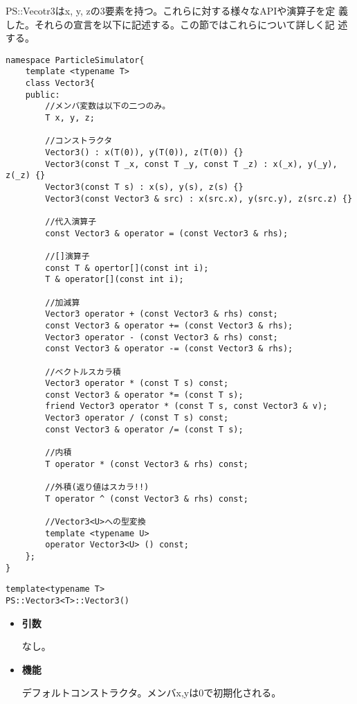 PS::Vecotr3はx, y, zの3要素を持つ。これらに対する様々なAPIや演算子を定
義した。それらの宣言を以下に記述する。この節ではこれらについて詳しく記
述する。
\begin{lstlisting}[caption=Vector3]
namespace ParticleSimulator{
    template <typename T>
    class Vector3{
    public:
        //メンバ変数は以下の二つのみ。
        T x, y, z;

        //コンストラクタ
        Vector3() : x(T(0)), y(T(0)), z(T(0)) {}
        Vector3(const T _x, const T _y, const T _z) : x(_x), y(_y), z(_z) {}
        Vector3(const T s) : x(s), y(s), z(s) {}
        Vector3(const Vector3 & src) : x(src.x), y(src.y), z(src.z) {}

        //代入演算子
        const Vector3 & operator = (const Vector3 & rhs);

        //[]演算子
        const T & opertor[](const int i);
        T & operator[](const int i);

        //加減算
        Vector3 operator + (const Vector3 & rhs) const;
        const Vector3 & operator += (const Vector3 & rhs);
        Vector3 operator - (const Vector3 & rhs) const;
        const Vector3 & operator -= (const Vector3 & rhs);

        //ベクトルスカラ積
        Vector3 operator * (const T s) const;
        const Vector3 & operator *= (const T s);
        friend Vector3 operator * (const T s, const Vector3 & v);
        Vector3 operator / (const T s) const;
        const Vector3 & operator /= (const T s);

        //内積
        T operator * (const Vector3 & rhs) const;

        //外積(返り値はスカラ!!)
        T operator ^ (const Vector3 & rhs) const;

        //Vector3<U>への型変換
        template <typename U>
        operator Vector3<U> () const;
    };
}
\end{lstlisting}
\mbox{}
\begin{screen}
\begin{verbatim}
template<typename T>
PS::Vector3<T>::Vector3()
\end{verbatim}
\end{screen}

\begin{itemize}

\item{{\bf 引数}}

なし。

\item{{\bf 機能}}

デフォルトコンストラクタ。メンバx,yは0で初期化される。

\end{itemize}

